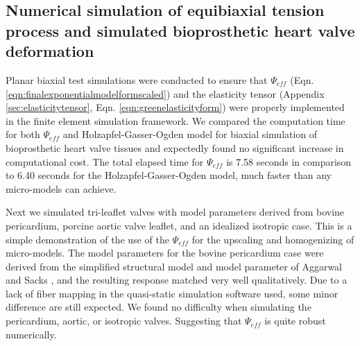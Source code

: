 	




\subsection{Numerical simulation of equibiaxial tension process and simulated bioprosthetic heart valve deformation}
	
    Planar biaxial test simulations were conducted to ensure that $\Psi_{eff}$ (Eqn. \ref{eqn:finalexponentialmodelformscaled}) and the elasticity tensor (Appendix \ref{sec:elasticitytensor}, Eqn. \ref{eqn:greenelasticityform}) were properly implemented in the finite element simulation framework.  We compared the computation time for both $\Psi_{eff}$ and Holzapfel-Gasser-Ogden model for biaxial simulation of bioprosthetic heart valve tissues and expectedly found no significant increase in computational cost. The total elapsed time for $\Psi_{eff}$ is 7.58 seconds in comparison to 6.40 seconds for the Holzapfel-Gasser-Ogden model, much faster than any micro-models can achieve.  

	Next we simulated tri-leaflet valves with model parameters derived from bovine pericardium, porcine aortic valve leaflet, and an idealized isotropic case. This is a simple demonstration of the use of the $\Psi_{eff}$ for the upscaling and homogenizing of micro-models. The model parameters for the bovine pericardium case were derived from the simplified structural model and model parameter of Aggarwal and Sacks \cite{aggarwal_inverse_2015}, and the resulting response matched very well qualitatively. Due to a lack of fiber mapping in the quasi-static simulation software used, some minor difference are still expected. We found no difficulty when simulating the pericardium, aortic, or isotropic valves. Suggesting that $\Psi_{eff}$ is quite robust numerically.
	
